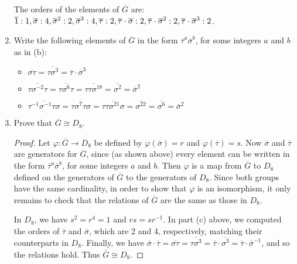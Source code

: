 \documentclass{article}
\begin{document}
\begin{enumerate}[label=(\alph*), itemsep=0em]
          The orders of the elements of $\overline{G}$ are: $\overline{1}: 1, \overline{\sigma}: 4, \overline{\sigma}^2: 2, \overline{\sigma}^3: 4, \overline{\tau}: 2, \\ \overline{\tau}\cdot\overline{\sigma}: 2, \overline{\tau}\cdot\overline{\sigma}^2: 2, \overline{\tau}\cdot\overline{\sigma}^3: 2$.
    \item Write the following elements of $\overline{G}$ in the form $\overline{\tau}^a \overline{\sigma}^b$, for some integers $a$ and $b$ as in (b):
          \begin{itemize}[itemsep=0em]
            \item $\overline{\sigma \tau} = \overline{\tau \sigma^3} = \overline{\tau} \cdot \overline{\sigma}^3$
            \item $\overline{\tau \sigma^{-2} \tau} = \overline{\tau \sigma^6 \tau} = \overline{\tau \tau \sigma^{18}} = \overline{\sigma^2} = \overline{\sigma}^2$
            \item $\overline{\tau^{-1} \sigma^{-1} \tau \sigma} = \overline{\tau \sigma^7 \tau \sigma} = \overline{\tau \tau \sigma^{21} \sigma} = \overline{\sigma^{22}} = \overline{\sigma^6} = \overline{\sigma}^2$
          \end{itemize}
    \item Prove that $\overline{G} \cong D_8$.
          \begin{proof}
            Let $\varphi: \overline{G} \rightarrow D_8$ be defined by $\varphi(\overline{\sigma}) = r$ and $\varphi(\overline{\tau}) = s$. Now $\overline{\sigma}$ and $\overline{\tau}$ are generators for $\overline{G}$, since (as shown above) every element can be written in the form $\overline{\tau}^a \overline{\sigma}^b$, for some integers $a$ and $b$. Then $\varphi$ is a map from $\overline{G}$ to $D_8$ defined on the generators of $\overline{G}$ to the generators of $D_8$. Since both groups have the same cardinality, in order to show that $\varphi$ is an isomorphism, it only remains to check that the relations of $\overline{G}$ are the same as those in $D_8$.

            In $D_8$, we have $s^2 = r^4 = 1$ and $rs = sr^{-1}$. In part (c) above, we computed the orders of $\overline{\tau}$ and $\overline{\sigma}$, which are 2 and 4, respectively, matching their counterparts in $D_8$. Finally, we have $\overline{\sigma}\cdot\overline{\tau} = \overline{\sigma\tau} = \overline{\tau\sigma^3} = \overline{\tau}\cdot\overline{\sigma^3} = \overline{\tau}\cdot\overline{\sigma}^{-1}$, and so the relations hold. Thus $\overline{G} \cong D_8$.
          \end{proof}
\end{enumerate}
\end{document}
